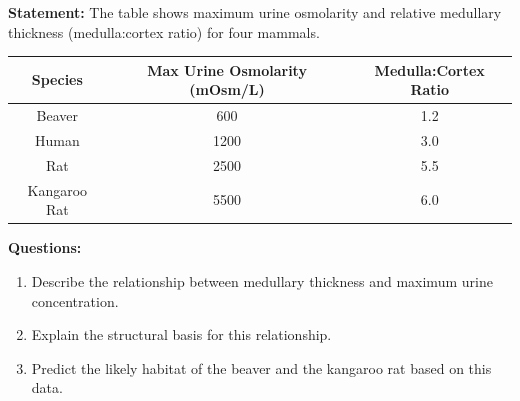 \documentclass[11pt]{article}
\begin{document}
\begin{exoresolu}
\textbf{Statement:} The table shows maximum urine osmolarity and relative medullary thickness (medulla:cortex ratio) for four mammals.

\begin{center}
\begin{tabular}{|c|c|c|}\hline
\textbf{Species} & \textbf{Max Urine Osmolarity (mOsm/L)} & \textbf{Medulla:Cortex Ratio} \\\hline
Beaver & 600 & 1.2 \\\hline
Human & 1200 & 3.0 \\\hline
Rat & 2500 & 5.5 \\\hline
Kangaroo Rat & 5500 & 6.0 \\\hline
\end{tabular}
\end{center}

\textbf{Questions:}
\begin{enumerate}
    \item Describe the relationship between medullary thickness and maximum urine concentration.
    \item Explain the structural basis for this relationship.
    \item Predict the likely habitat of the beaver and the kangaroo rat based on this data.
\end{enumerate}


\end{exoresolu}
\end{document}
